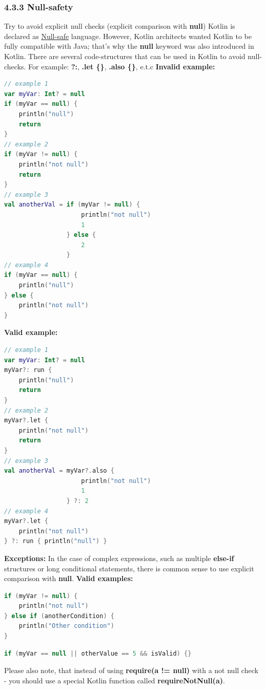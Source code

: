 \subsubsection*{\textbf{4.3.3 Null-safety}}
\leavevmode\newline
\label{sec:4.3.3}
Try to avoid explicit null checks (explicit comparison with \textbf{null})
Kotlin is declared as \href{https://kotlinlang.org/docs/reference/null-safety.html}{Null-safe} language.
However, Kotlin architects wanted Kotlin to be fully compatible with Java; that's why the \textbf{null} keyword was also introduced in Kotlin.
There are several code-structures that can be used in Kotlin to avoid null-checks. For example: \textbf{?:},  \textbf{.let \{\}}, \textbf{.also \{\}}, e.t.c
\textbf{Invalid example:}
\begin{lstlisting}[language=Kotlin]
// example 1
var myVar: Int? = null
if (myVar == null) {
    println("null")
    return
}
// example 2
if (myVar != null) {
    println("not null")
    return
}
// example 3
val anotherVal = if (myVar != null) {
                     println("not null")
                     1
                 } else {
                     2
                 }
// example 4
if (myVar == null) {
    println("null")
} else {
    println("not null")
}
\end{lstlisting}
\textbf{Valid example:}
\begin{lstlisting}[language=Kotlin]
// example 1
var myVar: Int? = null
myVar?: run {
    println("null")
    return
}
// example 2
myVar?.let {
    println("not null")
    return
}
// example 3
val anotherVal = myVar?.also {
                     println("not null")
                     1
                 } ?: 2
// example 4
myVar?.let {
    println("not null")
} ?: run { println("null") }
\end{lstlisting}
\textbf{Exceptions:}
In the case of complex expressions, such as multiple \textbf{else-if} structures or long conditional statements, there is common sense to use explicit comparison with \textbf{null}.
\textbf{Valid examples:}
\begin{lstlisting}[language=Kotlin]
if (myVar != null) {
    println("not null")
} else if (anotherCondition) {
    println("Other condition")
}
\end{lstlisting}
\begin{lstlisting}[language=Kotlin]
if (myVar == null || otherValue == 5 && isValid) {}
\end{lstlisting}
Please also note, that instead of using \textbf{require(a != null)} with a not null check - you should use a special Kotlin function called \textbf{requireNotNull(a)}.
